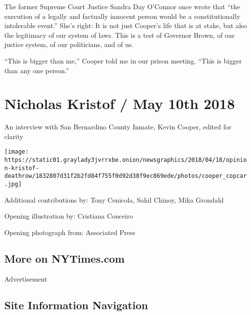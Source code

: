 The former Supreme Court Justice Sandra Day O'Connor once wrote that
``the execution of a legally and factually innocent person would be a
constitutionally intolerable event.'' She's right: It is not just
Cooper's life that is at stake, but also the legitimacy of our system of
laws. This is a test of Governor Brown, of our justice system, of our
politicians, and of us.

``This is bigger than me,'' Cooper told me in our prison meeting. ``This
is bigger than any one person.''

\hypertarget{nicholas-kristof--may-10th-2018}{%
\section{Nicholas Kristof / May 10th
2018}\label{nicholas-kristof--may-10th-2018}}

An interview with San Bernardino County Inmate, Kevin Cooper, edited for
clarity

\texttt{[image: https://static01.graylady3jvrrxbe.onion/newsgraphics/2018/04/18/opinion-kristof-deathrow/1832807d31f2b2fd84f755f0d92d38f9ec869ede/photos/cooper\_copcar.jpg]}

 Additional contributions by: Tony Cenicola, Sahil Chinoy, Mika Grondahl

 Opening illustration by: Cristiana Couceiro

 Opening photograph from: Associated Press

\hypertarget{more-on-nytimescom}{%
\subsection{More on NYTimes.com}\label{more-on-nytimescom}}

Advertisement

\hypertarget{site-information-navigation}{%
\subsection{Site Information
Navigation}\label{site-information-navigation}}

